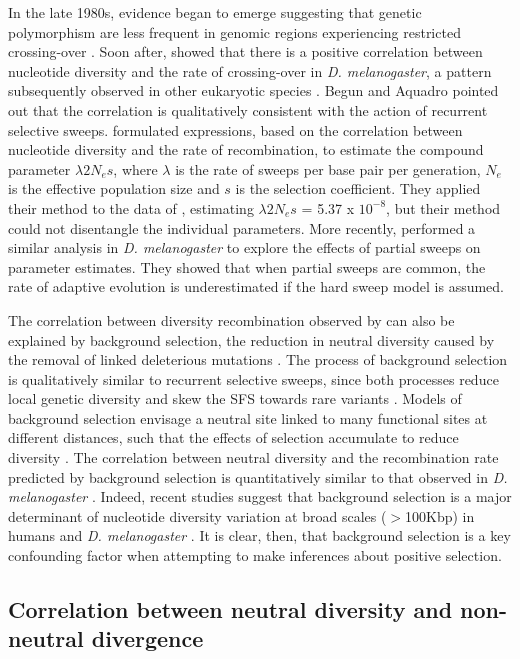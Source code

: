 In the late 1980s, evidence began to emerge suggesting that genetic polymorphism are less frequent in genomic regions experiencing restricted crossing-over \citep{RN225,RN282}. Soon after, \cite{RN114} showed that there is a positive correlation between nucleotide diversity and the rate of crossing-over in \emph{D. melanogaster}, a pattern subsequently observed in other eukaryotic species \citep{RN117}. Begun and Aquadro pointed out that the correlation is qualitatively consistent with the action of recurrent selective sweeps. \cite{RN277} formulated expressions, based on the correlation between nucleotide diversity and the rate of recombination, to estimate the compound parameter $\lambda 2N_{e}s$, where $\lambda$ is the rate of sweeps per base pair per generation, $N_e$ is the effective population size and $s$ is the selection coefficient. They applied their method to the data of \cite{RN114}, estimating $\lambda2N_{e}s$ = 5.37 x $10^{-8}$, but their method could not disentangle the individual parameters. More recently, \cite{RN226} performed a similar analysis in \emph{D. melanogaster} to explore the effects of partial sweeps on parameter estimates. They showed that when partial sweeps are common, the rate of adaptive evolution is underestimated if the hard sweep model is assumed.
 
The correlation between diversity recombination observed by \cite{RN114} can also be explained by background selection, the reduction in neutral diversity caused by the removal of linked deleterious mutations \citep{RN132}. The process of background selection is qualitatively similar to recurrent selective sweeps, since both processes reduce local genetic diversity \citep{RN110} and skew the SFS towards rare variants \citep{RN287,RN133}. Models of background selection envisage a neutral site linked to many functional sites at different distances, such that the effects of selection accumulate to reduce diversity \citep{RN206, RN157}. The correlation between neutral diversity and the recombination rate predicted by background selection is quantitatively similar to that observed in \emph{D. melanogaster} \citep{RN281}. Indeed, recent studies suggest that background selection is a major determinant of nucleotide diversity variation at broad scales ($>$100Kbp) in humans \cite{RN120} and \emph{D. melanogaster} \citep{RN288, RN116}. It is clear, then, that background selection is a key confounding factor when attempting to make inferences about positive selection.
 
\subsection[Correlations between neutral diversity and non-neutral divergence]{Correlation between neutral diversity and non-neutral divergence}

